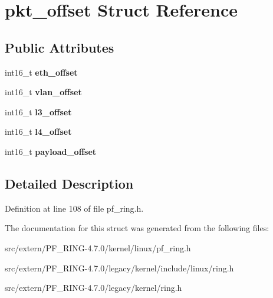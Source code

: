 \hypertarget{structpkt__offset}{
\section{pkt\_\-offset Struct Reference}
\label{structpkt__offset}
}
\subsection*{Public Attributes}
\begin{DoxyCompactItemize}
\item 
\hypertarget{structpkt__offset_a29ac837d4b1639b718bf1a6a19b0bf23}{
int16\_\-t {\bfseries eth\_\-offset}}
\label{structpkt__offset_a29ac837d4b1639b718bf1a6a19b0bf23}

\item 
\hypertarget{structpkt__offset_a881cfe1883ef4652e7420788be9e5e98}{
int16\_\-t {\bfseries vlan\_\-offset}}
\label{structpkt__offset_a881cfe1883ef4652e7420788be9e5e98}

\item 
\hypertarget{structpkt__offset_a921f996d3682b8961c12afd5d14c2c14}{
int16\_\-t {\bfseries l3\_\-offset}}
\label{structpkt__offset_a921f996d3682b8961c12afd5d14c2c14}

\item 
\hypertarget{structpkt__offset_a480e8b61fdc07a7e155a4aa2207c6f47}{
int16\_\-t {\bfseries l4\_\-offset}}
\label{structpkt__offset_a480e8b61fdc07a7e155a4aa2207c6f47}

\item 
\hypertarget{structpkt__offset_a03490d1cf7f071c9e52a63f71c4b3511}{
int16\_\-t {\bfseries payload\_\-offset}}
\label{structpkt__offset_a03490d1cf7f071c9e52a63f71c4b3511}

\end{DoxyCompactItemize}


\subsection{Detailed Description}


Definition at line 108 of file pf\_\-ring.h.



The documentation for this struct was generated from the following files:\begin{DoxyCompactItemize}
\item 
src/extern/PF\_\-RING-\/4.7.0/kernel/linux/pf\_\-ring.h\item 
src/extern/PF\_\-RING-\/4.7.0/legacy/kernel/include/linux/ring.h\item 
src/extern/PF\_\-RING-\/4.7.0/legacy/kernel/ring.h\end{DoxyCompactItemize}
